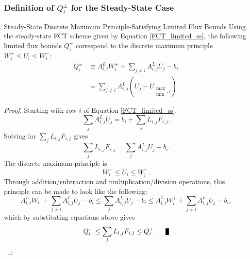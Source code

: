 \subsubsection{Definition of $Q_i^\pm$ for the Steady-State Case}
\begin{theorem}{Steady-State Discrete Maximum Principle-Satisfying Limited
  Flux Bounds}
   Using the steady-state FCT scheme given by Equation \eqref{FCT_limited_ss},
   the following limited flux bounds $Q_i^\pm$ correspond to the discrete
   maximum principle $W_i^+\le U_i\le W_i^-$:
   \begin{equation}
   \begin{split}
      Q_i^\pm & \equiv A_{i,i}^L W_i^\pm + \sum\limits_{j\ne i} A_{i,j}^L U_j - b_i\\
      & = \sum\limits_{j\ne i}A_{i,j}^L(U_j - U_{\substack{\max\\\min},i}).
   \end{split}
   \end{equation}
\end{theorem}

\begin{proof}
   Starting with row $i$ of Equation \eqref{FCT_limited_ss},
   \[
      \sum\limits_j A_{i,j}^L U_j
      = b_i + \sum\limits_j L_{i,j}F_{i,j}.
   \]
   Solving for $\sum\limits_j L_{i,j}F_{i,j}$ gives
   \[
      \sum\limits_j L_{i,j}F_{i,j} =
      \sum\limits_j A_{i,j}^L U_j
      - b_i.
   \]
   The discrete maximum principle is
   \[
      W_i^-\le U_i\le W_i^+.
   \]
   Through addition/subtraction and multiplication/division operations, this
   principle can be made to look like the following:
   \[
   A_{i,i}^L W_i^- + \sum\limits_{j\ne i} A_{i,j}^L U_j - b_i
   \le \sum\limits_j A_{i,j}^L U_j - b_i
   \le A_{i,i}^L W_i^+ + \sum\limits_{j\ne i} A_{i,j}^L U_j - b_i,
   \]
   which by substituting equations above gives
   \[
      Q_i^-\le\sum\limits_j L_{i,j}F_{i,j}\le Q_i^+.\qed
   \]
\end{proof}
